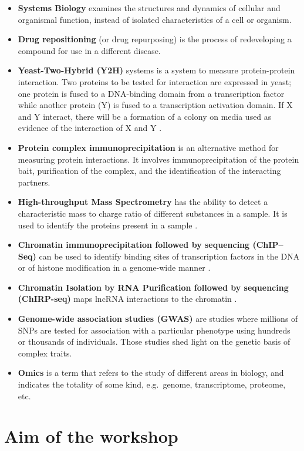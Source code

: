 \documentclass[
]{book}
\begin{document}
\begin{itemize}
\item
  \textbf{Systems Biology} examines the structures and dynamics of cellular and organismal function, instead of isolated characteristics of a cell or organism.
\item
  \textbf{Drug repositioning} (or drug repurposing) is the process of redeveloping a compound for use in a different disease.
\item
  \textbf{Yeast-Two-Hybrid (Y2H)} systems is a system to measure protein-protein interaction. Two proteins to be tested for interaction are expressed in yeast; one protein is fused to a DNA-binding domain from a transcription factor while another protein (Y) is fused to a transcription activation domain. If X and Y interact, there will be a formation of a colony on media used as evidence of the interaction of X and Y \citep{Parrish2006YeastMapping}.
\item
  \textbf{Protein complex immunoprecipitation} is an alternative method for measuring protein interactions. It involves immunoprecipitation of the protein bait, purification of the complex, and the identification of the interacting partners.
\item
  \textbf{High-throughput Mass Spectrometry} has the ability to detect a characteristic mass to charge ratio of different substances in a sample. It is used to identify the proteins present in a sample \citep{Kempa2019HighAnalysis}.
\item
  \textbf{Chromatin immunoprecipitation followed by sequencing (ChIP--Seq)} can be used to identify binding sites of transcription factors in the DNA or of histone modification in a genome-wide manner \citep{Park2009ChIP-seq:Technology}.\\
\item
  \textbf{Chromatin Isolation by RNA Purification followed by sequencing (ChIRP-seq)} maps lncRNA interactions to the chromatin \citep{Park2009ChIP-seq:Technology}.
\item
  \textbf{Genome-wide association studies (GWAS)} are studies where millions of SNPs are tested for association with a particular phenotype using hundreds or thousands of individuals. Those studies shed light on the genetic basis of complex traits.
\item
  \textbf{Omics} is a term that refers to the study of different areas in biology, and indicates the totality of some kind, e.g.~genome, transcriptome, proteome, etc.
\end{itemize}

\hypertarget{aim-of-the-workshop}{%
\section{Aim of the workshop}\label{aim-of-the-workshop}}
\end{document}
